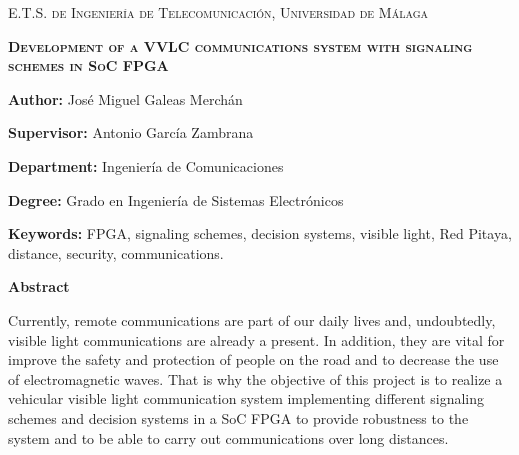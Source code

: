 
\pagestyle{fancy}

\begin{center}
	\scshape
	E.T.S. de Ingeniería de Telecomunicación, Universidad de Málaga
\end{center}

\bigskip

\begin{center}
	\scshape
	\textbf{Development of a VVLC communications system with signaling schemes in SoC FPGA}
\end{center}

\bigskip \bigskip \bigskip

\begin{minipage}{\textwidth}

\textbf{Author:} José Miguel Galeas Merchán

\medskip

\textbf{Supervisor:} Antonio García Zambrana



\medskip

\textbf{Department:} Ingeniería de Comunicaciones

\medskip

\textbf{Degree:} Grado en Ingeniería de Sistemas Electrónicos

\medskip

\textbf{Keywords:} FPGA, signaling schemes, decision systems, visible light,
Red Pitaya, distance, security, communications. 

\bigskip \bigskip


\end{minipage}

\begin{center}
	\textbf{Abstract}
\end{center}


Currently, remote communications are part of our daily lives and,
undoubtedly, visible light communications are already a present. In addition, they are
vital for improve the safety and protection of people on the road and to decrease the use
of electromagnetic waves. That is why the objective of this project is to realize a 
vehicular visible light communication system implementing different signaling schemes and 
decision systems in a SoC FPGA to provide robustness to the system and to be able to 
carry out communications over long distances.

